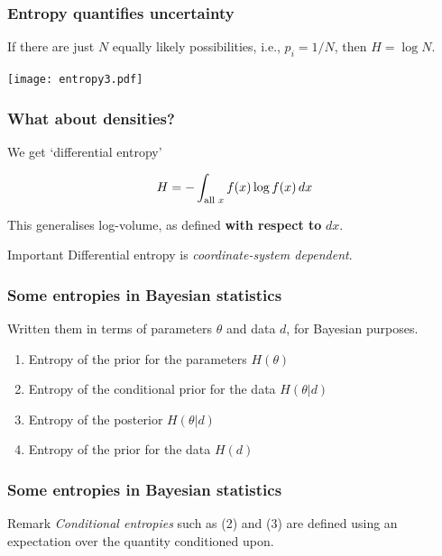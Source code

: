 \documentclass{beamer}
\begin{document}
\begin{frame}
\frametitle{Entropy quantifies uncertainty}
If there are just $N$ equally likely possibilities,
i.e., $p_i = 1/N$, then $H = \log N$. \vspace{0.5em}

\begin{center}
\texttt{[image: entropy3.pdf]}
\end{center}

\end{frame}


\begin{frame}
\frametitle{What about densities?}
We get `differential entropy'

\begin{align}
H = - \int_{\textnormal{all }x} f(x) \log f(x) \, dx
\end{align}

This generalises log-volume, as defined {\bf with respect to} $dx$.

\begin{alertblock}{Important}
Differential entropy is {\em coordinate-system dependent}.
\end{alertblock}

\end{frame}






\begin{frame}
\frametitle{Some entropies in Bayesian statistics}
Written them in terms of parameters $\theta$ and data
$d$, for Bayesian purposes.

\begin{enumerate}
\item<2-> Entropy of the prior for the parameters $H(\theta)$
\item<3-> Entropy of the conditional prior for the data $H(\theta | d)$
\item<4-> Entropy of the posterior $H(\theta | d)$
\item<5-> Entropy of the prior for the data $H(d)$
\end{enumerate}

\end{frame}


\begin{frame}
\frametitle{Some entropies in Bayesian statistics}

\begin{block}{Remark}
{\em Conditional entropies} such as (2) and (3)
are defined using an expectation over the quantity conditioned upon.
\end{block}

\end{frame}
\end{document}

